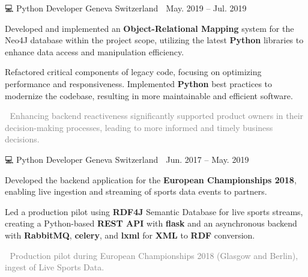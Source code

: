 \documentclass[11pt, a4paper]{awesome-cv}
\newcommand{\hll}[1]{\noindent\colorbox{light-gray}{\parbox{18cm}{\textcolor{gray}{#1}}}}
\begin{document}
{\begin{cventries}
		{💻 Python Developer} %
		{Geneva Switzerland 📍} %
		{May. 2019 – Jul. 2019 📆} %
		{\begin{cvitems}
				\item {Developed and implemented an \textbf{Object-Relational Mapping} system for the Neo4J
				            database within the project scope, utilizing the latest \textbf{Python} libraries to
				            enhance data access and manipulation efficiency.}
				\item {Refactored critical components of legacy code, focusing on optimizing performance
				            and responsiveness. Implemented \textbf{Python} best practices to modernize the codebase,
				            resulting in more maintainable and efficient software.}
				\\
				\newline
				\hll{🎯 Enhancing backend reactiveness significantly supported product owners in their
					decision-making processes, leading to more informed and timely business decisions.}
			\end{cvitems}
		}


		{💻 Python Developer} %
		{Geneva Switzerland 📍} %
		{Jun. 2017 – May. 2019 📆} %
		{\begin{cvitems}
				\item {Developed the backend application for the \textbf{European Championships
					            2018}, enabling live ingestion and streaming of sports data events to partners.}
				\item {Led a production pilot using \textbf{RDF4J} Semantic Database for live
				            sports streams, creating a Python-based \textbf{REST API} with \textbf{flask} and
				            an asynchronous backend with \textbf{RabbitMQ}, \textbf{celery}, and \textbf{lxml}
				            for \textbf{XML} to \textbf{RDF} conversion.}
				\\
				\newline
				\hll{🎯 Production pilot during European Championships 2018 (Glasgow and Berlin),
					ingest of Live Sports Data.}
			\end{cvitems}
		}



\end{cventries}}
\end{document}

